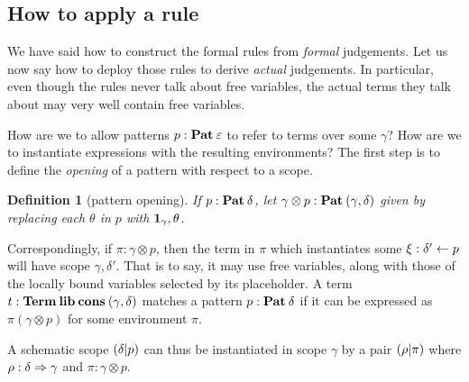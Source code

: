 \documentclass{jfp1}
\newtheorem{definition}[theorem]{Definition}
\newcommand{\emp}{\varepsilon}
\begin{document}
\subsection{How to apply a rule}

We have said how to construct the formal rules from \emph{formal}
judgements. Let us now say how to deploy those rules to derive
\emph{actual} judgements. In particular, even though the rules never
talk about free variables, the actual terms they talk about may very
well contain free variables.

How are we to allow patterns $p : \Pat\emp$ to refer to terms over
some $\gamma$? How are we to instantiate expressions with the
resulting environments? The first step is to define the \emph{opening}
of a pattern with respect to a scope.

\begin{definition}[pattern opening]
  If $p : \textbf{Pat}\:\delta$, let $\gamma\otimes p : \textbf{Pat}\:(\gamma,\delta)$
  given by replacing each $\theta$ in $p$ with $\mathbf{1}_\gamma,\theta$.
\end{definition}

Correspondingly, if $\pi:\gamma\otimes p$, then the term in $\pi$
which instantiates some $\xi : \delta'\leftarrow p$ will have scope
$\gamma,\delta'$. That is to say, it may use free variables, along
with those of the locally bound variables selected by its placeholder.
A term $t:\mathbf{Term}\:\textbf{lib}\:\textbf{cons}\:(\gamma,\delta)$ matches a pattern
$p:\textbf{Pat}\:\delta$ if it can be expressed as $\pi(\gamma\otimes p)$ for
some environment $\pi$.

A schematic scope $(\delta|p)$ can thus be instantiated in scope $\gamma$ by a pair
$(\rho|\pi)$ where $\rho : \delta\Rightarrow\gamma$ and $\pi : \gamma\otimes
p$.
\end{document}
